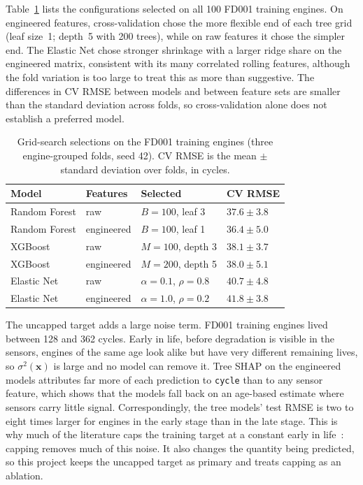 Table~\ref{tab:model_selection} lists the configurations selected on all 100
FD001 training engines. On engineered features, cross-validation chose the
more flexible end of each tree grid (leaf size~1; depth~5 with 200 trees),
while on raw features it chose the simpler end. The Elastic Net chose stronger
shrinkage with a larger ridge share on the engineered matrix, consistent with
its many correlated rolling features, although the fold variation is too
large to treat this as more than suggestive. The differences in CV RMSE between models and between feature sets are
smaller than the standard deviation across folds, so cross-validation alone
does not establish a preferred model.

\begin{table}[t]
\centering
\caption{Grid-search selections on the FD001 training engines (three
engine-grouped folds, seed 42). CV RMSE is the mean $\pm$ standard deviation
over folds, in cycles.}
\label{tab:model_selection}
\begin{tabular}{llll}
\hline
Model & Features & Selected & CV RMSE \\
\hline
Random Forest & raw        & $B=100$, leaf 3          & $37.6\pm3.8$ \\
Random Forest & engineered & $B=100$, leaf 1          & $36.4\pm5.0$ \\
XGBoost       & raw        & $M=100$, depth 3         & $38.1\pm3.7$ \\
XGBoost       & engineered & $M=200$, depth 5         & $38.0\pm5.1$ \\
Elastic Net   & raw        & $\alpha=0.1$, $\rho=0.8$ & $40.7\pm4.8$ \\
Elastic Net   & engineered & $\alpha=1.0$, $\rho=0.2$ & $41.8\pm3.8$ \\
\hline
\end{tabular}
\end{table}

The uncapped target adds a large noise term. FD001 training engines lived
between 128 and 362 cycles. Early in life, before degradation is visible in the
sensors, engines of the same age look alike but have very different remaining
lives, so $\sigma^2(\mathbf{x})$ is large and no model can remove it. Tree SHAP
on the engineered models attributes far more of each prediction to
\texttt{cycle} than to any sensor feature, which shows that the models fall back on
an age-based estimate where sensors carry little signal. Correspondingly, the
tree models' test RMSE is two to eight times larger for engines in the early
stage than in the late stage. This is why much of the
literature caps the training target at a constant early in
life~\cite{Heimes2008recurrent,Zheng2017long}: capping removes much of this
noise. It also changes the quantity being predicted, so this project keeps the
uncapped target as primary and treats capping as an ablation.

